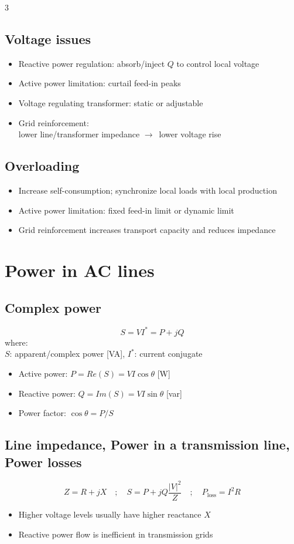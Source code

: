 \documentclass[9pt, landscape, a4paper]{article}
\let\mathto\to
\renewcommand{\to}{\ensuremath{\mathto}\ }
\begin{document}
\begin{multicols*}{3}
\subsection{Voltage issues}
\begin{itemize}
  \item Reactive power regulation: absorb/inject $Q$ to control local voltage
  \item Active power limitation: curtail feed-in peaks
  \item Voltage regulating transformer: static or adjustable
  \item Grid reinforcement:\\lower line/transformer impedance \to lower voltage rise
\end{itemize}

\subsection{Overloading}
\begin{itemize}
  \item Increase self-consumption; synchronize local loads with local production
  \item Active power limitation: fixed feed-in limit or dynamic limit
  \item Grid reinforcement increases transport capacity and reduces impedance
\end{itemize}

\section{Power in AC lines}
\subsection{Complex power}
\[S = V I^* = P + jQ\]
where:\\
$S$: apparent/complex power [VA], $I^*$: current conjugate
\begin{itemize}
  \item Active power: $P = Re(S) = VI\cos\theta$ [W]
  \item Reactive power: $Q = Im(S) = VI\sin\theta$ [var]
  \item Power factor: $\cos\theta = P/S$
\end{itemize}

\subsection{Line impedance, Power in a transmission line, Power losses}
\[Z = R + jX\quad ;\quad S = P+jQ\frac{\left|V\right|^2}{Z}\quad ;\quad P_\text{loss} = I^2R\]
\begin{itemize}
  \item Higher voltage levels usually have higher reactance $X$
  \item Reactive power flow is inefficient in transmission grids
\end{itemize}


\end{multicols*}
\end{document}

